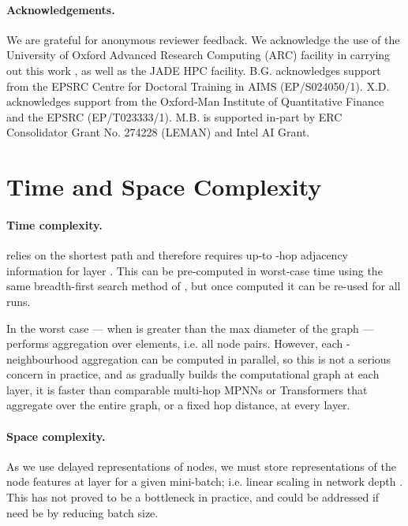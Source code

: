 \documentclass{article}
\theoremstyle{plain}
\theoremstyle{definition}
\theoremstyle{remark}
\begin{document}
\paragraph{Acknowledgements.}
We are grateful for anonymous reviewer feedback. We acknowledge the use of the University of Oxford Advanced Research Computing (ARC) facility in carrying out this work \cite{richards2021arc}
, as well as the
JADE
HPC facility.
B.G. acknowledges support from the EPSRC Centre for Doctoral Training in AIMS (EP/S024050/1).
X.D. acknowledges support from the Oxford-Man Institute of Quantitative
Finance and the EPSRC (EP/T023333/1).
M.B. is supported in-part by ERC Consolidator Grant No. 274228 (LEMAN) and Intel AI Grant.




\newpage



\newpage
\appendix
\onecolumn

\section{Time and Space Complexity}
\label{appendix:complexity}
\paragraph{Time complexity.}  relies on the shortest path and therefore requires up-to -hop adjacency information for layer . This can be pre-computed in worst-case time  using the same breadth-first search method of \citet{abboud2022shortest}, but once computed it can be re-used for all runs.

In the worst case --- when  is greater than the max diameter of the graph ---  performs aggregation over  elements, i.e. all node pairs. However, each -neighbourhood aggregation can be computed in parallel, so this is not a serious concern in practice, and as  gradually builds the computational graph at each layer, it is faster than comparable multi-hop MPNNs or Transformers that aggregate over the entire graph, or a fixed hop distance, at every layer.

\paragraph{Space complexity.} As we use delayed representations of nodes, we must store  representations of the node features at layer  for a given mini-batch; i.e. linear scaling in network depth . This has not proved to be a bottleneck in practice, and could be addressed if need be by reducing batch size.
\end{document}
